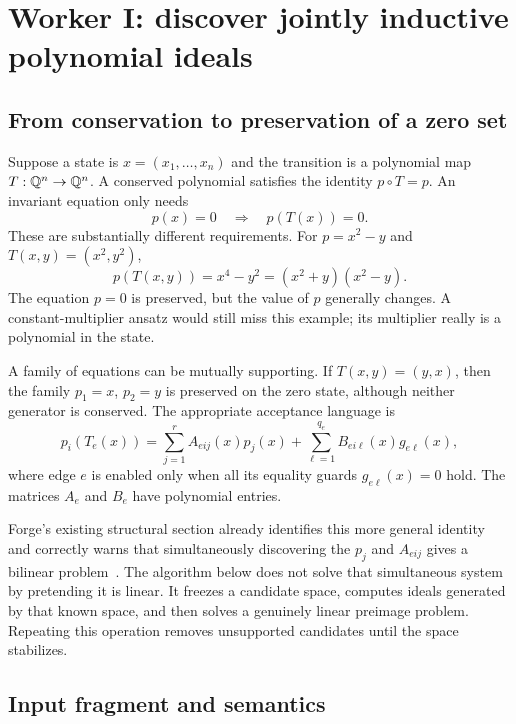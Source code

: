 \section{Worker I: discover jointly inductive polynomial ideals}
\label{sec:ideals}

\subsection{From conservation to preservation of a zero set}

Suppose a state is $x=(x_1,\ldots,x_n)$ and the transition is a polynomial map
$T:\mathbb{Q}^n\to\mathbb{Q}^n$. A conserved polynomial satisfies the identity $p\circ T=p$.
An invariant equation only needs
\[
 p(x)=0\quad\Longrightarrow\quad p(T(x))=0.
\]
These are substantially different requirements. For $p=x^2-y$ and
$T(x,y)=(x^2,y^2)$,
\begin{equation}
 p(T(x,y))=x^4-y^2=(x^2+y)(x^2-y).
 \label{eq:nonlinear-curve}
\end{equation}
The equation $p=0$ is preserved, but the value of $p$ generally changes. A
constant-multiplier ansatz would still miss this example; its multiplier really
is a polynomial in the state.

A family of equations can be mutually supporting. If $T(x,y)=(y,x)$, then the
family $p_1=x$, $p_2=y$ is preserved on the zero state, although neither generator
is conserved. The appropriate acceptance language is
\begin{equation}
 p_i(T_e(x))=
 \sum_{j=1}^{r}A_{eij}(x)p_j(x)+
 \sum_{\ell=1}^{q_e}B_{ei\ell}(x)g_{e\ell}(x),
 \label{eq:ideal-step}
\end{equation}
where edge $e$ is enabled only when all its equality guards
$g_{e\ell}(x)=0$ hold. The matrices $A_e$ and $B_e$ have polynomial entries.

Forge's existing structural section already identifies this more general
identity and correctly warns that simultaneously discovering the $p_j$ and
$A_{eij}$ gives a bilinear problem~\cite{forge-structural}. The algorithm below
does not solve that simultaneous system by pretending it is linear. It freezes
a candidate space, computes ideals generated by that known space, and then
solves a genuinely linear preimage problem. Repeating this operation removes
unsupported candidates until the space stabilizes.

\subsection{Input fragment and semantics}

